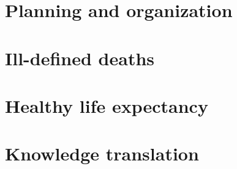 \documentclass[]{book}
\begin{document}
\chapter{Planning and organization}\label{planning-and-organization}

\chapter{Ill-defined deaths}\label{ill-defined-deaths}

\chapter{Healthy life expectancy}\label{healthy-life-expectancy}

\chapter{Knowledge translation}\label{knowledge-translation}


\end{document}

